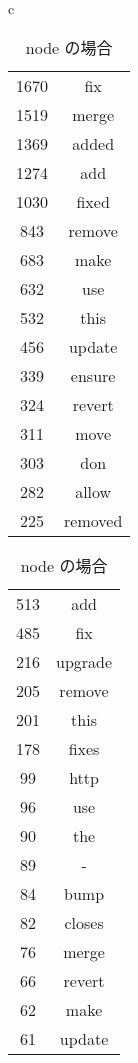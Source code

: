 \documentclass{jarticle}
\begin{document}
  \begin{table}[htbp]
   \begin{center}
    \begin{tabular}{c}

     \begin{minipage}{0.3\hsize}
      \begin{center}
       \caption{rails の場合}
       \begin{tabular}{c|c}
        \hline
        1670 & fix \\
        1519 & merge \\
        1369 & added \\
        1274 & add \\
        1030 & fixed \\
        843 & remove \\
        683 & make \\
        632 & use \\
        532 & this \\
        456 & update \\
        339 & ensure \\
        324 & revert \\
        311 & move \\
        303 & don \\
        282 & allow \\
        225 & removed \\
        \hline
       \end{tabular}
      \end{center}
     \end{minipage}

     \begin{minipage}{0.3\hsize}
      \begin{center}
       \caption{node の場合}
       \begin{tabular}{c|c}
        \hline
        513 & add \\
        485 & fix \\
        216 & upgrade \\
        205 & remove \\
        201 & this \\
        178 & fixes \\
        99 & http \\
        96 & use \\
        90 & the \\
        89 & - \\
        84 & bump \\
        82 & closes \\
        76 & merge \\
        66 & revert \\
        62 & make \\
        61 & update \\
        \hline
       \end{tabular}
      \end{center}
     \end{minipage}



\end{tabular}
\end{center}
\end{table}
\end{document}
